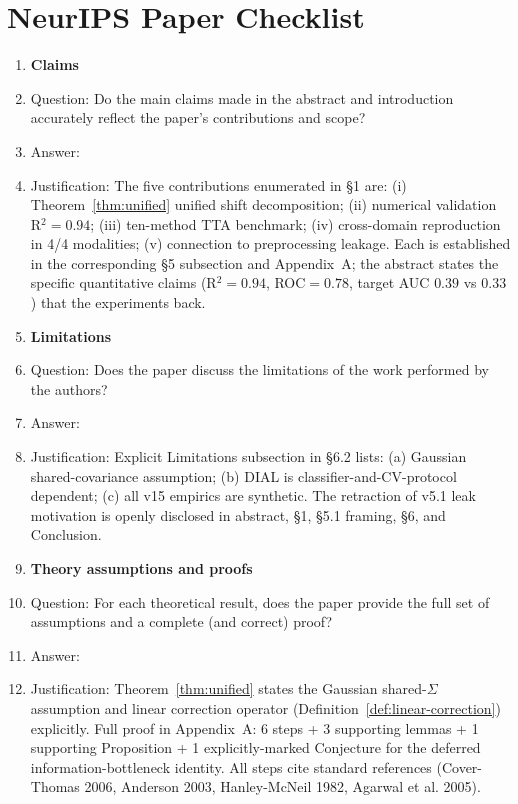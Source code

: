 
\section*{NeurIPS Paper Checklist}

\begin{enumerate}

\item {\bf Claims}
    \item[] Question: Do the main claims made in the abstract and introduction accurately reflect the paper's contributions and scope?
    \item[] Answer: \answerYes{}
    \item[] Justification: The five contributions enumerated in §1 are: (i) Theorem~\ref{thm:unified} unified shift decomposition; (ii) numerical validation R$^{2}{=}0.94$; (iii) ten-method TTA benchmark; (iv) cross-domain reproduction in 4/4 modalities; (v) connection to preprocessing leakage. Each is established in the corresponding §5 subsection and Appendix~A; the abstract states the specific quantitative claims (R$^{2}{=}0.94$, ROC$=0.78$, target AUC $0.39$ vs $0.33$) that the experiments back.

\item {\bf Limitations}
    \item[] Question: Does the paper discuss the limitations of the work performed by the authors?
    \item[] Answer: \answerYes{}
    \item[] Justification: Explicit Limitations subsection in §6.2 lists: (a) Gaussian shared-covariance assumption; (b) DIAL is classifier-and-CV-protocol dependent; (c) all v15 empirics are synthetic. The retraction of v5.1 leak motivation is openly disclosed in abstract, §1, §5.1 framing, §6, and Conclusion.

\item {\bf Theory assumptions and proofs}
    \item[] Question: For each theoretical result, does the paper provide the full set of assumptions and a complete (and correct) proof?
    \item[] Answer: \answerYes{}
    \item[] Justification: Theorem~\ref{thm:unified} states the Gaussian shared-$\Sigma$ assumption and linear correction operator (Definition~\ref{def:linear-correction}) explicitly. Full proof in Appendix~A: 6 steps + 3 supporting lemmas + 1 supporting Proposition + 1 explicitly-marked Conjecture for the deferred information-bottleneck identity. All steps cite standard references (Cover-Thomas 2006, Anderson 2003, Hanley-McNeil 1982, Agarwal et al. 2005).


\end{enumerate}
